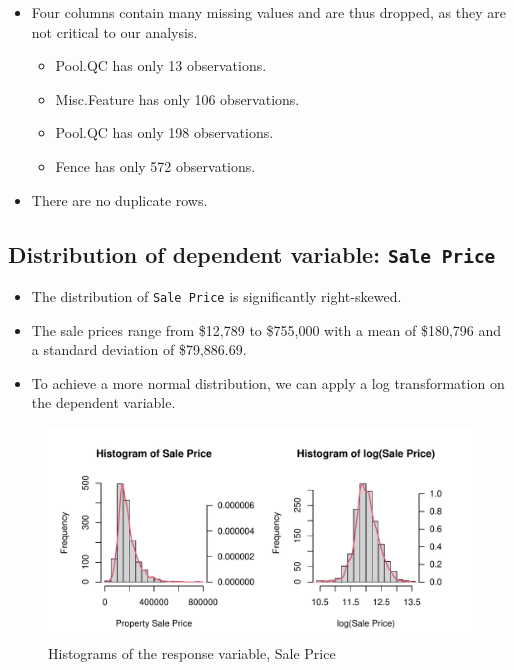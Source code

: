 \documentclass[aoas]{imsart}
\providecommand{\tightlist}{%
  \setlength{\itemsep}{0pt}\setlength{\parskip}{0pt}}
\numberwithin{equation}{section}
\theoremstyle{plain}
\theoremstyle{remark}
\begin{document}
\begin{itemize}
\tightlist
\item
  Four columns contain many missing values and are thus dropped, as they
  are not critical to our analysis. \vspace{0.2cm}

  \begin{itemize}
  \tightlist
  \item
    Pool.QC has only 13 observations.
  \item
    Misc.Feature has only 106 observations.
  \item
    Pool.QC has only 198 observations.
  \item
    Fence has only 572 observations. \vspace{0.2cm}
  \end{itemize}
\item
  There are no duplicate rows.
\end{itemize}

\hypertarget{distribution-of-dependent-variable}{%
\subsection{\texorpdfstring{Distribution of dependent variable:
\texttt{Sale Price}}{Distribution of dependent variable: }}\label{distribution-of-dependent-variable}}

\begin{itemize}
\tightlist
\item
  The distribution of \texttt{Sale Price} is significantly right-skewed.
\item
  The sale prices range from \$12,789 to \$755,000 with a mean of
  \$180,796 and a standard deviation of \$79,886.69.
\item
  To achieve a more normal distribution, we can apply a log
  transformation on the dependent variable.
\end{itemize}

\begin{figure}
\centering
\includegraphics{STAT-444-FINAL-PROJECT-PROPOSAL_files/figure-latex/unnamed-chunk-5-1.pdf}
\caption{Histograms of the response variable, Sale Price\label{}}
\end{figure}
\end{document}
